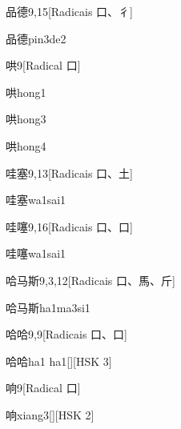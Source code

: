 \begin{entry}{品德}{9,15}[Radicais ⼝、⼻]
  \begin{phonetics}{品德}{pin3de2}
  \end{phonetics}
\end{entry}

\begin{entry}{哄}{9}[Radical ⼝]
  \begin{phonetics}{哄}{hong1}
  \end{phonetics}
  \begin{phonetics}{哄}{hong3}
  \end{phonetics}
  \begin{phonetics}{哄}{hong4}
  \end{phonetics}
\end{entry}

\begin{entry}{哇塞}{9,13}[Radicais ⼝、⼟]
  \begin{phonetics}{哇塞}{wa1sai1}
  \end{phonetics}
\end{entry}

\begin{entry}{哇噻}{9,16}[Radicais ⼝、⼝]
  \begin{phonetics}{哇噻}{wa1sai1}
  \end{phonetics}
\end{entry}

\begin{entry}{哈马斯}{9,3,12}[Radicais ⼝、⾺、⽄]
  \begin{phonetics}{哈马斯}{ha1ma3si1}
  \end{phonetics}
\end{entry}

\begin{entry}{哈哈}{9,9}[Radicais ⼝、⼝]
  \begin{phonetics}{哈哈}{ha1 ha1}[][HSK 3]
  \end{phonetics}
\end{entry}

\begin{entry}{响}{9}[Radical ⼝]
  \begin{phonetics}{响}{xiang3}[][HSK 2]
  \end{phonetics}
\end{entry}

